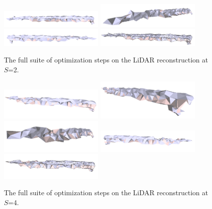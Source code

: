 \documentclass[12pt]{drexelthesis}
\begin{document}
\begin{figure}[!ht]
	\centering
		\includegraphics[width=2in]{real-lab-scans/meshed/optimized/scalespace2everything00.png}
		\includegraphics[width=2in]{real-lab-scans/meshed/optimized/scalespace2everything01.png}
		\includegraphics[width=2in]{real-lab-scans/meshed/optimized/scalespace2everything02.png}
		\includegraphics[width=2in]{real-lab-scans/meshed/optimized/scalespace2everything03.png}
		\caption[The full suite of optimization steps on the LiDAR reconstruction at $S$=2.]{\centering The full suite of optimization steps on the LiDAR reconstruction at $S$=2.}
	\label{lidar:scalespace2everything}
\end{figure}

\begin{figure}[!ht]
	\centering
		\includegraphics[width=2in]{real-lab-scans/meshed/optimized/scalespace4everything00.png}
		\includegraphics[width=2in]{real-lab-scans/meshed/optimized/scalespace4everything01.png}
		\includegraphics[width=2in]{real-lab-scans/meshed/optimized/scalespace4everything02.png}
		\includegraphics[width=2in]{real-lab-scans/meshed/optimized/scalespace4everything03.png}
		\includegraphics[width=2in]{real-lab-scans/meshed/optimized/scalespace4everything04.png}
		\caption[The full suite of optimization steps on the LiDAR reconstruction at $S$=4.]{\centering The full suite of optimization steps on the LiDAR reconstruction at $S$=4.}
	\label{lidar:scalespace4everything}
\end{figure}
\end{document}
